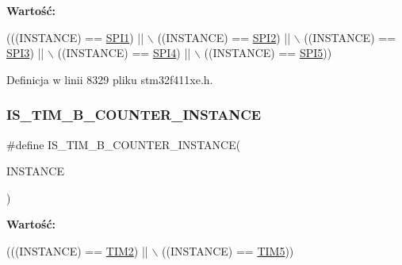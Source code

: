 {\bfseries Wartość\+:}
\begin{DoxyCode}
(((INSTANCE) == \hyperlink{group___peripheral__declaration_gad483be344a28ac800be8f03654a9612f}{SPI1}) || \(\backslash\)
                                       ((INSTANCE) == \hyperlink{group___peripheral__declaration_gaf2c3d8ce359dcfbb2261e07ed42af72b}{SPI2}) || \(\backslash\)
                                       ((INSTANCE) == \hyperlink{group___peripheral__declaration_gab2339cbf25502bf562b19208b1b257fc}{SPI3}) || \(\backslash\)
                                       ((INSTANCE) == \hyperlink{group___peripheral__declaration_ga2a2e6edef68cfe1946f39a5033da2301}{SPI4}) || \(\backslash\)
                                       ((INSTANCE) == \hyperlink{group___peripheral__declaration_ga5e676c061e19ced149b7c6de6b8985e5}{SPI5}))
\end{DoxyCode}


Definicja w linii 8329 pliku stm32f411xe.\+h.

\mbox{\label{group___exported__macros_gac41867bf288927ff8ff10a85e67a591b}} 
\subsubsection{\texorpdfstring{I\+S\+\_\+\+T\+I\+M\+\_\+B\+\_\+\+C\+O\+U\+N\+T\+E\+R\+\_\+\+I\+N\+S\+T\+A\+N\+CE}{IS\_TIM\_32B\_COUNTER\_INSTANCE}}
{\footnotesize\ttfamily \#define I\+S\+\_\+\+T\+I\+M\+\_\+B\+\_\+\+C\+O\+U\+N\+T\+E\+R\+\_\+\+I\+N\+S\+T\+A\+N\+CE(\begin{DoxyParamCaption}\item[{}]{I\+N\+S\+T\+A\+N\+CE }\end{DoxyParamCaption})}

{\bfseries Wartość\+:}
\begin{DoxyCode}
(((INSTANCE) == \hyperlink{group___peripheral__declaration_ga3cfac9f2e43673f790f8668d48b4b92b}{TIM2}) || \(\backslash\)
                                              ((INSTANCE) == \hyperlink{group___peripheral__declaration_ga5125ff6a23a2ed66e2e19bd196128c14}{TIM5}))
\end{DoxyCode}



